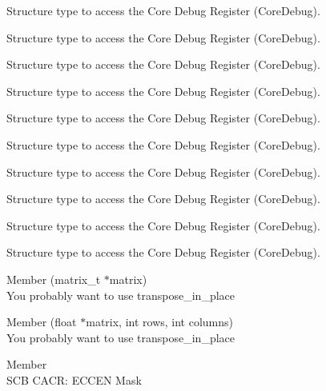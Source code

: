 \begin{DoxyRefList}
\label{deprecated__deprecated000455}%
%
Structure type to access the Core Debug Register (Core\+Debug). 

\label{deprecated__deprecated000557}%
%
Structure type to access the Core Debug Register (Core\+Debug). 

\label{deprecated__deprecated000663}%
%
Structure type to access the Core Debug Register (Core\+Debug). 

\label{deprecated__deprecated000763}%
%
Structure type to access the Core Debug Register (Core\+Debug). 

\label{deprecated__deprecated000817}%
%
Structure type to access the Core Debug Register (Core\+Debug). 

\label{deprecated__deprecated000902}%
%
Structure type to access the Core Debug Register (Core\+Debug). 

\label{deprecated__deprecated000959}%
%
Structure type to access the Core Debug Register (Core\+Debug). 

\label{deprecated__deprecated001035}%
%
Structure type to access the Core Debug Register (Core\+Debug). 

\label{deprecated__deprecated001114}%
%
Structure type to access the Core Debug Register (Core\+Debug). 

\label{deprecated__deprecated001216}%
%
Structure type to access the Core Debug Register (Core\+Debug).  
\item[Member \doxylink{classei_1_1numpy_a520e4180b78706b654b44823d6cab8a2}{ei\+::numpy\+::transpose} (matrix\+\_\+t \texorpdfstring{$\ast$}{*}matrix)]\hfill \\
\label{deprecated__deprecated001320}%
%
You probably want to use transpose\+\_\+in\+\_\+place  
\item[Member \doxylink{classei_1_1numpy_abb29484c8a643860fbc67703d8aaffbe}{ei\+::numpy\+::transpose} (float \texorpdfstring{$\ast$}{*}matrix, int rows, int columns)]\hfill \\
\label{deprecated__deprecated001321}%
%
You probably want to use transpose\+\_\+in\+\_\+place  
\item[Member \doxylink{group___c_m_s_i_s___s_c_b_ga7456a0b93710e8b9fa2b94c946e96c5c}{SCB\+\_\+\+CACR\+\_\+\+ECCEN\+\_\+\+Msk} ]\hfill \\
\label{deprecated__deprecated000556}%
%
SCB CACR\+: ECCEN Mask 


\end{DoxyRefList}
